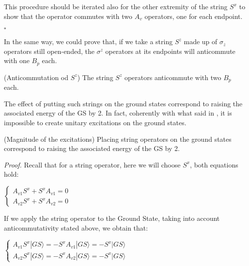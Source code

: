 This procedure should be iterated also for the other extremity of the string $S^x$ to show that the operator commutes with two $A_v$ operators, one for each endpoint.\newline

\hfill $\square$ \newline

In the same way, we could prove that, if we take a string $S^z$ made up of $\sigma_z$ operators still open-ended, the $\sigma^z$ operators at its endpoints will anticommute with one $B_p$ each.\newline

\begin{proposition}(Anticommutation od $S^z$)
	The string $S^z$ operators anticommute with two $B_p$ each.
\end{proposition}

The effect of putting such strings on the ground states correspond to raising the associated energy of the GS by 2. In fact, coherently with what said in \textit{\cite{Her20}}, it is impossible to create unitary excitations on the ground states.

\begin{proposition}(Magnitude of the excitations)
	Placing string operators on the ground states correspond to raising the associated energy of the GS by 2.
\end{proposition}

\textit{Proof.} \newline
Recall that for a string operator, here we will choose $S^x$, both equations hold:

\begin{center}
	$\begin{cases} 
		A_{v1} S^x + S^x A_{v1} =0 \\
		A_{v2} S^x + S^x A_{v2} =0
	\end{cases}$ 
\end{center}

If we apply the string operator to the Ground State, taking into account anticommutativity stated above, we obtain that:

\begin{center}
	$\begin{cases}
		A_{v1} S^x |GS\rangle = - S^x A_{v1} |GS\rangle = - S^x |GS\rangle \\
		
		A_{v2} S^x |GS\rangle = - S^x A_{v2} |GS\rangle = - S^x |GS\rangle
	\end{cases}$ 
\end{center}

